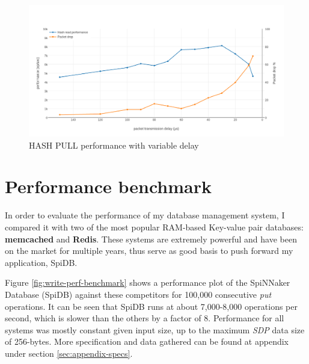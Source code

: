 \begin{figure}
\begin{center}
	\includegraphics[width=1.3\textwidth, natwidth=1063, natheight=550]{images/hash_performance.png}
\end{center}
\caption{HASH PULL performance with variable delay}
\label{fig:hash-performance}
\end{figure}



\section{Performance benchmark}
In order to evaluate the performance of my database management system, I compared it with two of the most popular RAM-based Key-value pair databases: \textbf{memcached}\cite{memcached} and \textbf{Redis}\cite{redis}. These systems are extremely powerful and have been on the market for multiple years, thus serve as good basis to push forward my application, SpiDB.

Figure \ref{fig:write-perf-benchmark} shows a performance plot of the SpiNNaker Database (SpiDB) against these competitors for 100,000 consecutive \textit{put} operations. It can be seen that SpiDB runs at about 7,000-8,000 operations per second, which is slower than the others by a factor of 8. Performance for all systems was mostly constant given input size, up to the maximum \textit{SDP} data size of 256-bytes. More specification and data gathered can be found at appendix under section \ref{sec:appendix-specs}.

